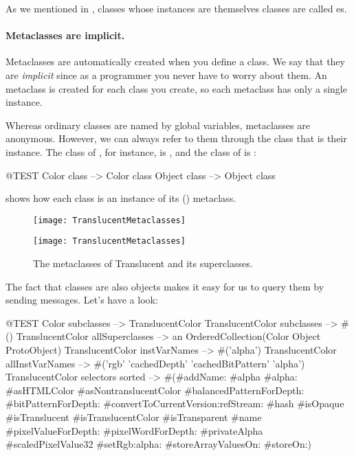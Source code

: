 \documentclass[a4paper,10pt,twoside]{book}
\begin{document}

As we mentioned in , classes whose instances are themselves classes are called es.

\paragraph{Metaclasses are implicit.}
Metaclasses are automatically created when you define a class.
We say that they are \emph{implicit} since as a programmer you never have to worry about them.
An  metaclass is created for each class you create, so each metaclass has only a single instance.

Whereas ordinary classes are named by global variables, metaclasses are anonymous.
However, we can always refer to them through the class that is their instance.
The class of , for instance, is , and the class of  is :
\begin{code}{@TEST}
Color class   --> Color class
Object class --> Object class
\end{code}

\noindent
{} shows how each class is an instance of its () metaclass.

\begin{center}
\begin{figure}[!ht]
\ifluluelse
	{\centerline {\texttt{[image: TranslucentMetaclasses]}}}
	{\centerline {\texttt{[image: TranslucentMetaclasses]}}}
\caption{The metaclasses of Translucent and its superclasses.\label{fig:translucentmetaclasses}}
\end{figure}
\end{center}

The fact that classes are also objects makes it easy for us to query them by sending messages.
Let's have a look:

\begin{code}{@TEST}
Color subclasses                           --> {TranslucentColor}
TranslucentColor subclasses         --> #()
TranslucentColor allSuperclasses  --> an OrderedCollection(Color Object ProtoObject)
TranslucentColor instVarNames     --> #('alpha')
TranslucentColor allInstVarNames --> #('rgb' 'cachedDepth' 'cachedBitPattern' 'alpha')
TranslucentColor selectors sorted --> #(#addName: #alpha #alpha: #asHTMLColor #asNontranslucentColor #balancedPatternForDepth: #bitPatternForDepth: #convertToCurrentVersion:refStream: #hash #isOpaque #isTranslucent #isTranslucentColor #isTransparent #name #pixelValueForDepth: #pixelWordForDepth: #privateAlpha #scaledPixelValue32 #setRgb:alpha: #storeArrayValuesOn: #storeOn:)
\end{code}
\end{document}
